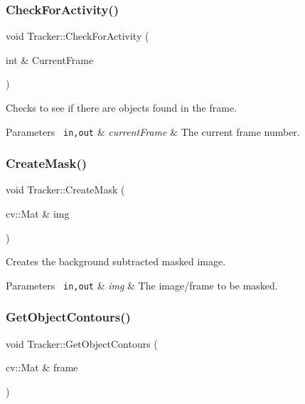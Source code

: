 \subsubsection{\texorpdfstring{CheckForActivity()}{CheckForActivity()}}
{\footnotesize\ttfamily void Tracker\+::\+Check\+For\+Activity (\begin{DoxyParamCaption}\item[{int \&}]{Current\+Frame }\end{DoxyParamCaption})}

Checks to see if there are objects found in the frame. 
\begin{DoxyParams}[1]{Parameters}
\mbox{\texttt{ in,out}}  & {\em current\+Frame} & The current frame number. \\
\hline
\end{DoxyParams}
\mbox{\label{class_tracker_af7bbb0a0156ad28f80e1fccaa9b94ba4}} 
\subsubsection{\texorpdfstring{CreateMask()}{CreateMask()}}
{\footnotesize\ttfamily void Tracker\+::\+Create\+Mask (\begin{DoxyParamCaption}\item[{cv\+::\+Mat \&}]{img }\end{DoxyParamCaption})}

Creates the background subtracted masked image. 
\begin{DoxyParams}[1]{Parameters}
\mbox{\texttt{ in,out}}  & {\em img} & The image/frame to be masked. \\
\hline
\end{DoxyParams}
\mbox{\label{class_tracker_ab7f677682b169cb7276797a511d12947}} 
\subsubsection{\texorpdfstring{GetObjectContours()}{GetObjectContours()}}
{\footnotesize\ttfamily void Tracker\+::\+Get\+Object\+Contours (\begin{DoxyParamCaption}\item[{cv\+::\+Mat \&}]{frame }\end{DoxyParamCaption})}

